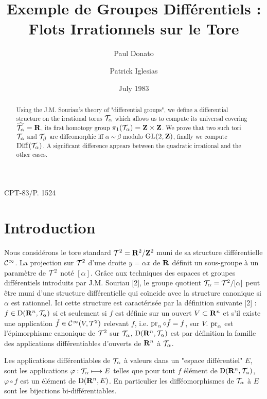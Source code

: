 \documentclass[10pt]{amsart}
\title{Exemple de Groupes Différentiels : Flots Irrationnels sur le Tore}
\author{Paul Donato}
\author{Patrick Iglesias}
\date{July 1983}
\renewcommand{\Torus}{\cT}
\renewcommand{\UniversalCover}[1]{\widehat{#1}}
\begin{document}
  
  \maketitle
  
  \begin{abstract}
    Using the J.M. Souriau's theory of "differential groups",
    we define a differential structure on the irrational torus $\Torus_{\alpha}$ which allows us to compute its universal covering $\UniversalCover{\Torus_{\alpha}} = \fieldR$,
    its first homotopy group $\FundamentalGroup(\Torus_{\alpha}) = \ringZ \times \ringZ$.
    We prove that two such tori $\Torus_{\alpha}$ and $\Torus_{\beta}$ are diffeomorphic iff $\alpha \sim \beta$ modulo $\mathrm{GL}(2,{\mathbf{Z}})$,
    finally we compute $\Diff(\Torus_{\alpha})$.
    A significant difference appears between the quadratic irrational and the other cases.
  \end{abstract}
  
  \vspace{1cm}
  \begin{center}
    CPT-83/P. 1524
  \end{center}
  \vspace{1cm}
  
  \section*{Introduction}
  Nous considérons le tore standard $\Torus^2 = \fieldR^{2} / \ringZ^{2}$ muni de sa structure différentielle ${\mathcal{C}}^\infty$.
  La projection sur $\Torus^2$ d'une droite $y = \alpha x$ de ${\mathbf{R}}$ définit un sous-groupe à un paramètre de $\Torus^2$ noté $[\alpha]$.
  Grâce aux techniques des espaces et groupes différentiels introduits par J.M. Souriau [2],
  le groupe quotient $\Torus_{\alpha} = \Torus^2 / [\alpha]$ peut être muni d'une structure différentielle qui coïncide avec la structure canonique si $\alpha$ est rationnel.
  Ici cette structure est caractérisée par la définition suivante [2] :
  $f \in \Der(\fieldR^{n}, \Torus_{\alpha})$ si et seulement si $f$ est définie sur un ouvert $V \subset {\mathbf{R}}^{n}$ et s'il existe une application $\hat{f} \in \Cinfty(V, \Torus^2)$ relevant $f$,
  i.e. $\Proj_{\alpha} \circ \hat{f} = f$,
  sur $V$.
  $\Proj_{\alpha}$ est l'épimorphisme canonique de $\Torus^2$ sur $\Torus_{\alpha}$,
  $\Der(\fieldR^{n}, \Torus_{\alpha})$ est par définition la famille des applications différentiables d'ouverts de ${\mathbf{R}}^{n}$ à $\Torus_{\alpha}$.
  
  Les applications différentiables de $\Torus_{\alpha}$ à valeurs dans un "espace différentiel" $E$,
  sont les applications $\varphi : \Torus_{\alpha} \longmapsto E$ telles que pour tout $f$ élément de $\Der(\fieldR^{n}, \Torus_{\alpha})$,
  $\varphi \circ f$ est un élément de $\operatorname{D}({\mathbf{R}}^{n}, E)$.
  En particulier les difféomorphismes de $\Torus_{\alpha}$ à $E$ sont les bijections bi-différentiables.
  
\end{document}
